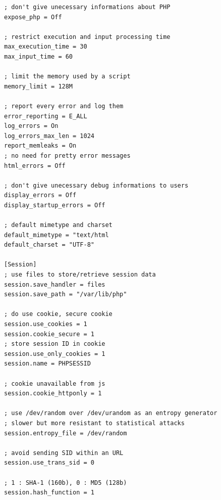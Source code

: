 \documentclass[a4paper]{article}
\begin{document}
\begin{verbatim}
; don't give unecessary informations about PHP
expose_php = Off

; restrict execution and input processing time
max_execution_time = 30
max_input_time = 60

; limit the memory used by a script
memory_limit = 128M

; report every error and log them
error_reporting = E_ALL
log_errors = On
log_errors_max_len = 1024
report_memleaks = On
; no need for pretty error messages
html_errors = Off

; don't give unecessary debug informations to users
display_errors = Off
display_startup_errors = Off

; default mimetype and charset
default_mimetype = "text/html
default_charset = "UTF-8"

[Session]
; use files to store/retrieve session data
session.save_handler = files
session.save_path = "/var/lib/php"

; do use cookie, secure cookie
session.use_cookies = 1
session.cookie_secure = 1
; store session ID in cookie
session.use_only_cookies = 1
session.name = PHPSESSID

; cookie unavailable from js
session.cookie_httponly = 1

; use /dev/random over /dev/urandom as an entropy generator
; slower but more resistant to statistical attacks
session.entropy_file = /dev/random

; avoid sending SID within an URL
session.use_trans_sid = 0

; 1 : SHA-1 (160b), 0 : MD5 (128b)
session.hash_function = 1
\end{verbatim}
\end{document}
